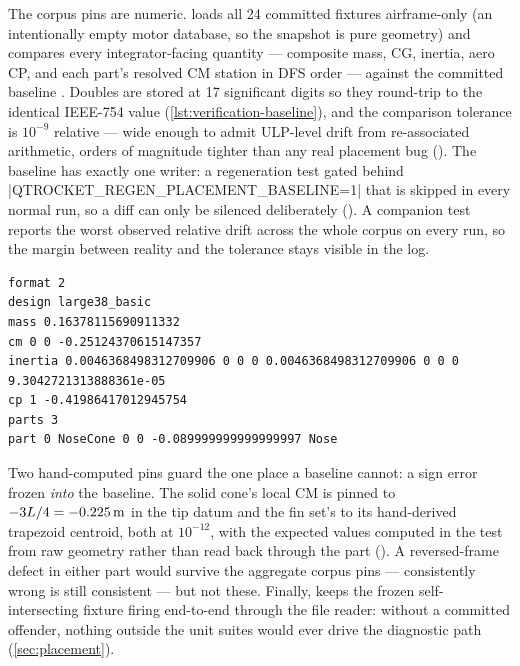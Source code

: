 The corpus pins are numeric.  loads all 24 committed fixtures
airframe-only (an intentionally empty motor database, so the snapshot is pure geometry) and
compares every integrator-facing quantity --- composite mass, CG, inertia, aero CP, and each
part's resolved CM station in DFS order --- against the committed baseline
. Doubles are stored at 17 significant digits
so they round-trip to the identical IEEE-754 value (\cref{lst:verification-baseline}), and the
comparison tolerance is $10^{-9}$ relative --- wide enough to admit ULP-level drift from
re-associated arithmetic, orders of magnitude tighter than any real placement bug
(). The baseline has exactly one writer: a
regeneration test gated behind \cppinline|QTROCKET_REGEN_PLACEMENT_BASELINE=1| that is skipped in
every normal run, so a diff can only be silenced deliberately
(). A companion test reports the worst observed
relative drift across the whole corpus on every run, so the margin between reality and the
tolerance stays visible in the log.

\begin{listing}[htbp]
\begin{verbatim}
format 2
design large38_basic
mass 0.16378115690911332
cm 0 0 -0.25124370615147357
inertia 0.0046368498312709906 0 0 0 0.0046368498312709906 0 0 0 9.3042721313888361e-05
cp 1 -0.41986417012945754
parts 3
part 0 NoseCone 0 0 -0.089999999999999997 Nose
\end{verbatim}
\caption{One fixture's block of the committed placement baseline
(): mass, CG, row-major inertia, CP, and
each part's resolved CM station in the tip datum, printed at 17 significant digits for exact
double round-trip.}\label{lst:verification-baseline}
\end{listing}

Two hand-computed pins guard the one place a baseline cannot: a sign error frozen \emph{into} the
baseline. The solid cone's local CM is pinned to $-3L/4 = -0.225\,\mathrm{m}$ in the tip datum and the fin
set's to its hand-derived trapezoid centroid, both at $10^{-12}$, with the expected values
computed in the test from raw geometry rather than read back through the part
(). A reversed-frame defect in either part would
survive the aggregate corpus pins --- consistently wrong is still consistent --- but not these.
Finally,  keeps the frozen self-intersecting fixture
 firing end-to-end through the file reader:
without a committed offender, nothing outside the unit suites would ever drive the diagnostic
path (\cref{sec:placement}).

